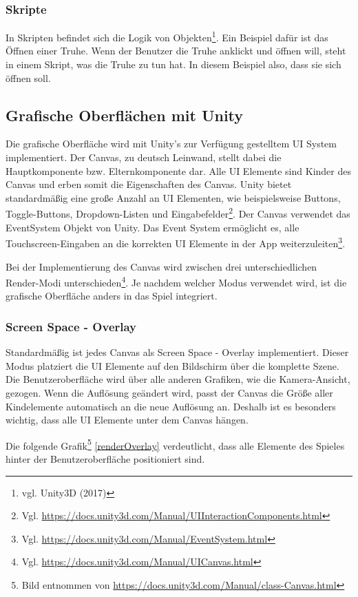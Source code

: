 		\subsubsection{Skripte}
			In Skripten befindet sich die Logik von Objekten\footnote{vgl. Unity3D \cite{unity8} (2017)}. Ein Beispiel dafür ist das Öffnen einer Truhe. Wenn der Benutzer die Truhe anklickt und öffnen will, steht in einem Skript, was die Truhe zu tun hat. In diesem Beispiel also, dass sie sich öffnen soll. 

	\subsection{Grafische Oberflächen mit Unity}
		Die grafische Oberfläche wird mit Unity's zur Verfügung gestelltem \ac{UI} System implementiert. Der Canvas, zu deutsch Leinwand, stellt dabei die Hauptkomponente bzw. Elternkomponente dar. Alle \ac{UI} Elemente sind Kinder des Canvas und erben somit die Eigenschaften des Canvas. Unity bietet standardmäßig eine große Anzahl an \ac{UI} Elementen, wie beispielsweise Buttons, Toggle-Buttons, Dropdown-Listen und Eingabefelder\footnote{Vgl. \url{https://docs.unity3d.com/Manual/UIInteractionComponents.html}}. Der Canvas verwendet das EventSystem Objekt von Unity. Das Event System ermöglicht es, alle Touchscreen-Eingaben an die korrekten \ac{UI} Elemente in der App weiterzuleiten\footnote{Vgl. \url{https://docs.unity3d.com/Manual/EventSystem.html}}.

		Bei der Implementierung des Canvas wird zwischen drei unterschiedlichen Render-Modi unterschieden\footnote{Vgl. \url{https://docs.unity3d.com/Manual/UICanvas.html}}. Je nachdem welcher Modus verwendet wird, ist die grafische Oberfläche anders in das Spiel integriert.

		\subsubsection{Screen Space - Overlay}
			Standardmäßig ist jedes Canvas als Screen Space - Overlay implementiert. Dieser Modus platziert die \ac{UI} Elemente auf den Bildschirm über die komplette Szene. Die Benutzeroberfläche wird über alle anderen Grafiken, wie die Kamera-Ansicht, gezogen. Wenn die Auflösung geändert wird, passt der Canvas die Größe aller Kindelemente automatisch an die neue Auflösung an. Deshalb ist es besonders wichtig, dass alle \ac{UI} Elemente unter dem Canvas hängen. 

			Die folgende Grafik\footnote{Bild entnommen von \url{https://docs.unity3d.com/Manual/class-Canvas.html}} \ref{renderOverlay} verdeutlicht, dass alle Elemente des Spieles hinter der Benutzeroberfläche positioniert sind.

